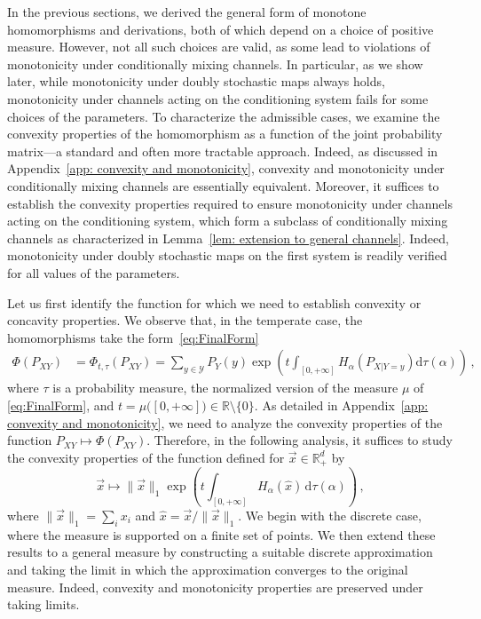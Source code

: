 \documentclass[aps,pra,11pt,onecolumn,nofootinbib,tightenlines]{revtex4-2}
\theoremstyle{definition}
\def \d {\mathrm{d}}
\newcommand{\Y}{\mathcal{Y}}
\newcommand{\R}{\mathbb{R}}
\begin{document}
In the previous sections, we derived the general form of monotone homomorphisms and derivations, both of which depend on a choice of positive measure. However, not all such choices are valid, as some lead to violations of monotonicity under conditionally mixing channels. In particular, as we show later, while monotonicity under doubly stochastic maps always holds, monotonicity under channels acting on the conditioning system fails for some choices of the parameters. To characterize the admissible cases, we examine the convexity properties of the homomorphism as a function of the joint probability matrix—a standard and often more tractable approach. Indeed, as discussed in Appendix~\ref{app: convexity and monotonicity}, convexity and monotonicity under conditionally mixing channels are essentially equivalent. Moreover, it suffices to establish the convexity properties required to ensure monotonicity under channels acting on the conditioning system, which form a subclass of conditionally mixing channels as characterized in Lemma~\ref{lem: extension to general channels}. Indeed, monotonicity under doubly stochastic maps on the first system is readily verified for all values of the parameters.

\medskip
Let us first identify the function for which we need to establish convexity or concavity properties. We observe that, in the temperate case, the homomorphisms take the form~\eqref{eq:FinalForm}
\begin{align}\label{eq:TemperateForm}
\Phi(P_{XY})&=\Phi_{t,\tau}(P_{XY})=
\sum_{y\in \Y} P_Y(y)\exp{\left(t\int_{[0,+\infty]}H_\alpha(P_{X|Y=y})\d\tau(\alpha)\right)} \,,
\end{align}
where $\tau$ is a probability measure, the normalized version of the measure $\mu$ of \eqref{eq:FinalForm}, and $t=\mu\big([0,+\infty]\big)\in\R\setminus\{0\}$. As detailed in Appendix~\ref{app: convexity and monotonicity}, we need to analyze the convexity properties of the function $P_{XY} \mapsto \Phi(P_{XY})$.
Therefore, in the following analysis, it suffices to study the convexity properties of the function defined for $\vec{x} \in \mathbb{R}^d_+$ by
\begin{equation}\label{eq:conditionfunct}
    \vec{x} \longmapsto \|\vec{x}\|_1 \exp\left( t\int_{[0,+\infty]} H_\alpha(\hat{x}) \,\d\tau(\alpha) \right)\,,
\end{equation}
where $\|\vec{x}\|_1=\sum_i x_i$ and $\hat{x} = \vec{x}/\|\vec{x}\|_1$. We begin with the discrete case, where the measure is supported on a finite set of points. We then extend these results to a general measure by constructing a suitable discrete approximation and taking the limit in which the approximation converges to the original measure. Indeed, convexity and monotonicity properties are preserved under taking limits.
\end{document}
